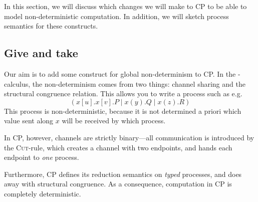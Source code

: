 \documentclass[twocolumn]{article}
\begin{document}
In this section, we will discuss which changes we will make to CP to be able to
model non-deterministic computation. In addition, we will sketch process
semantics for these constructs.

\subsection{Give and take}
Our aim is to add some construct for global non-determinism to CP.
In the \textpi-calculus, the non-determinism comes from two things: channel
sharing and the structural congruence relation.
This allows you to write a process such as e.g.\ %
\[
  (x[u].x[v].P \mid x(y).Q \mid x(z).R)
\]
This process is non-deterministic, because it is not determined a priori which
value sent along $x$ will be received by which process. 

In CP, however, channels are strictly binary---all communication is introduced
by the \textsc{Cut}-rule, which creates a channel with two endpoints, and hands
each endpoint to \emph{one} process.
\begin{proofblock}
  \BIC{$\seq[{\nu x.(P \mid Q)}]{ \Gamma , \Delta }$}
\end{proofblock}
Furthermore, CP defines its reduction semantics on \emph{typed} processes, and
does away with structural congruence.
As a consequence, computation in CP is completely deterministic.
\end{document}
